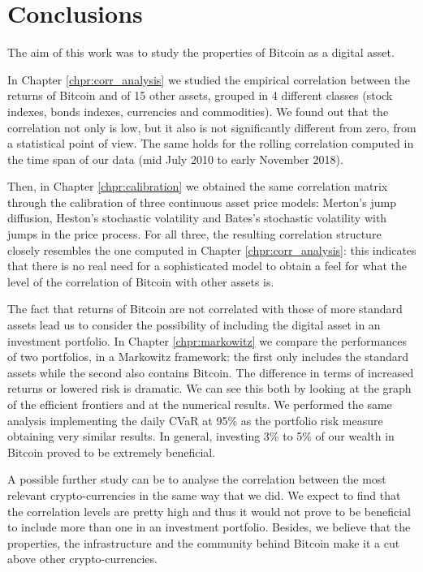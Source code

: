 \chapter{Conclusions}
\label{chpr:conclusion}


The aim of this work was to study the properties of Bitcoin as a digital asset.

In Chapter \ref{chpr:corr_analysis} we studied the empirical correlation between the returns of Bitcoin and of 15 other assets, grouped in 4 different classes (stock indexes, bonds indexes, currencies and commodities). We found out that the correlation not only is low, but it also is not significantly different from zero, from a statistical point of view. The same holds for the rolling correlation computed in the time span of our data (mid July 2010 to early November 2018).

Then, in Chapter \ref{chpr:calibration} we obtained the same correlation matrix through the calibration of three continuous asset price models: Merton's jump diffusion, Heston's stochastic volatility and Bates's stochastic volatility with jumps in the price process.
For all three, the resulting correlation structure closely resembles the one computed in Chapter \ref{chpr:corr_analysis}: this indicates that there is no real need for a sophisticated model to obtain a feel for what the level of the correlation of Bitcoin with other assets is.

The fact that returns of Bitcoin are not correlated with those of more standard assets lead us to consider the possibility of including the digital asset in an investment portfolio.
In Chapter \ref{chpr:markowitz} we compare the performances of two portfolios, in a Markowitz framework: the first only includes the standard assets while the second also contains Bitcoin. The difference in terms of increased returns or lowered risk is dramatic. We can see this both by looking at the graph of the efficient frontiers and at the numerical results.
We performed the same analysis implementing the daily CVaR at 95\% as the portfolio risk measure obtaining very similar results.
In general, investing 3\% to 5\% of our wealth in Bitcoin proved to be extremely beneficial.

\bigskip

A possible further study can be to analyse the correlation between the most relevant crypto-currencies in the same way that we did. We expect to find that the correlation levels are pretty high and thus it would not prove to be beneficial to include more than one in an investment portfolio. 
Besides, we believe that the properties, the  infrastructure and the community behind Bitcoin make it a cut above other crypto-currencies.

